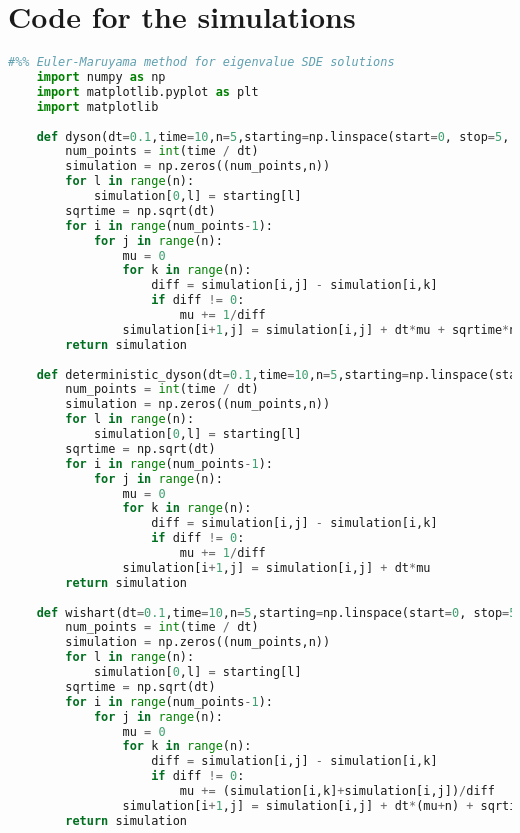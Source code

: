 \chapter{Code for the simulations} \label{appendix:codes}

\begin{lstlisting}[language=Python, caption=Euler-Maruyama algorithm for simulation of eigenvalue processes]
    #%% Euler-Maruyama method for eigenvalue SDE solutions
    import numpy as np
    import matplotlib.pyplot as plt
    import matplotlib
    
    def dyson(dt=0.1,time=10,n=5,starting=np.linspace(start=0, stop=5, num=5)):
        num_points = int(time / dt)
        simulation = np.zeros((num_points,n))
        for l in range(n):
            simulation[0,l] = starting[l]
        sqrtime = np.sqrt(dt)
        for i in range(num_points-1):
            for j in range(n):
                mu = 0
                for k in range(n):
                    diff = simulation[i,j] - simulation[i,k]
                    if diff != 0:
                        mu += 1/diff
                simulation[i+1,j] = simulation[i,j] + dt*mu + sqrtime*np.random.randn()
        return simulation
    
    def deterministic_dyson(dt=0.1,time=10,n=5,starting=np.linspace(start=0, stop=5, num=5)):
        num_points = int(time / dt)
        simulation = np.zeros((num_points,n))
        for l in range(n):
            simulation[0,l] = starting[l]
        sqrtime = np.sqrt(dt)
        for i in range(num_points-1):
            for j in range(n):
                mu = 0
                for k in range(n):
                    diff = simulation[i,j] - simulation[i,k]
                    if diff != 0:
                        mu += 1/diff
                simulation[i+1,j] = simulation[i,j] + dt*mu
        return simulation
    
    def wishart(dt=0.1,time=10,n=5,starting=np.linspace(start=0, stop=5, num=5)):
        num_points = int(time / dt)
        simulation = np.zeros((num_points,n))
        for l in range(n):
            simulation[0,l] = starting[l]
        sqrtime = np.sqrt(dt)
        for i in range(num_points-1):
            for j in range(n):
                mu = 0
                for k in range(n):
                    diff = simulation[i,j] - simulation[i,k]
                    if diff != 0:
                        mu += (simulation[i,k]+simulation[i,j])/diff
                simulation[i+1,j] = simulation[i,j] + dt*(mu+n) + sqrtime*np.random.randn()*np.sqrt(simulation[i,j])
        return simulation
    

\end{lstlisting}

